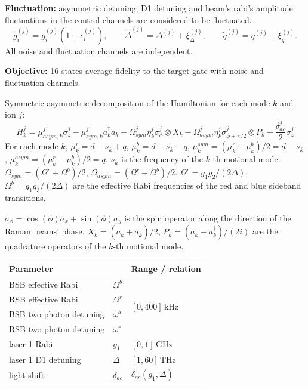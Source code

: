 \documentclass{simple-notes}
\begin{document}
\begin{notebox}[title=System Receipt]
\textbf{Fluctuation:} 
asymmetric detuning, D1 detuning and beam's rabi's amplitude fluctuations in the control channels are considered to be fluctuated.
\[\widetilde g_i^{(j)}=g_i^{(j)}(1+\epsilon_i^{(j)}),\qquad
\widetilde\Delta^{(j)}=\Delta^{(j)}+\xi_\Delta^{(j)},\qquad
\widetilde q^{(j)}=q^{(j)}+\xi_q^{(j)}.\]
All noise and fluctuation channels are independent.

\textbf{Objective:} 16 states average fidelity to the target gate with noise and fluctuation channels. 
\end{notebox}




\newpage
Symmetric-asymmetric decomposition of the Hamiltonian for each mode $k$ and ion $j$:
\begin{equation}
    H_k^j = \mu_{asym, k}^j\sigma_z^j - \mu_{sym, k}^j a^\dagger_k a_k + \Omega^{j}_{sym} \eta_k^j\sigma^j_{\phi}\otimes X_k -\Omega^{j}_{asym}\eta_k^j\sigma^j_{\phi+\pi/2}\otimes P_k + \frac{\delta_{ac}^j}{2} \sigma_z^j
\end{equation}
For each mode $k$, $\mu_k^r = d-\nu_k+q$, $\mu_k^b = d-\nu_k-q$, $\mu_k^{sym} = (\mu_k^r + \mu_k^b)/2 = d-\nu_k$, $\mu_k^{asym} = (\mu_k^r - \mu_k^b)/2 = q$.
$\nu_k$ is the frequency of the $k$-th motional mode. $\Omega_{sym} = (\Omega^r + \Omega^b)/2$, $\Omega_{asym} = (\Omega^r - \Omega^b)/2$. $\Omega^r = g_1 g_2/(2\Delta)$, $\Omega^b = g_1 g_3/(2\Delta)$ are the effective Rabi frequencies of the red and blue sideband transitions.

$\sigma_{\phi} = \cos(\phi)\sigma_x + \sin(\phi)\sigma_y$ is the spin operator along the direction of the Raman beams' phase. $X_k = (a_k + a_k^\dagger)/2$, $P_k = (a_k - a_k^\dagger)/(2i)$ are the quadrature operators of the $k$-th motional mode.


\begin{center}
    \begin{tabular}{|ll|l|}
        \hline
        \textbf{Parameter} && \textbf{Range / relation} \\
        \hline
        BSB effective Rabi &$\Omega^{b}$ & \multirow{4}{*}{$[0,400]\,\mathrm{kHz}$} \\
        RSB effective Rabi &$\Omega^{r}$ & \\
        BSB two photon detuning &$\omega^{b}$ & \\
        RSB two photon detuning &$\omega^{r}$ & \\
        \hline
        laser 1 Rabi &$g_1$ & $[0,1]\,\mathrm{GHz}$\\
        \hline
        laser 1 D1 detuning &$\Delta$ & $[1,60] \,\mathrm{THz}$\\ 
        \hline
        light shift &$\delta_{ac}$ & $\delta_{ac}(g_1,\Delta)$\\
        \hline
    \end{tabular}
\end{center}
\end{document}
